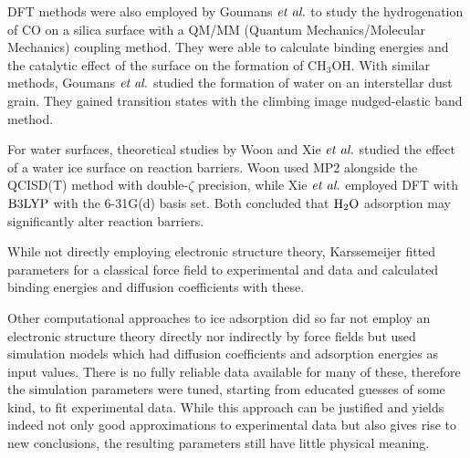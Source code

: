 DFT methods were also employed by Goumans $\emph{et al.}$ to study the hydrogenation of
CO on a silica surface with a QM/MM (Quantum Mechanics/Molecular
Mechanics) coupling method.
They were able to calculate binding energies and the catalytic effect of the
surface on the formation of CH$_3$OH.\cite{GoumansCatlowBrown2008} With similar
methods, Goumans $\emph{et al.}$  studied the formation of water on an
interstellar dust grain.\cite{GoumansCatlowBrownEtAl2009} They gained transition
states with the climbing image nudged-elastic band method\cite{HenkelmanUberuagaJonsson2000}.

For water surfaces, theoretical studies by Woon\cite{Woon2002}
and Xie $\emph{et al.}$\cite{XieDingSun2006} studied the effect of a water ice surface
on reaction barriers. Woon used MP2 \cite{MP2} alongside the QCISD(T)
\cite{QCISD} method with double-$\zeta$ precision, while Xie $\emph{et al.}$
employed DFT with $\text{B3LYP}$ with the 6-31G(d) basis set. Both concluded that
$\text H _2 \text O$ adsorption may significantly alter reaction barriers.

While not directly employing electronic structure theory, Karssemeijer fitted
parameters for a classical force field to experimental and  data
and calculated binding energies and diffusion coefficients with
these.\cite{KarssemeijerPedersenJonssonEtAl2012}

Other computational approaches to ice adsorption did so far not employ an
electronic structure theory directly nor indirectly by force fields but used
simulation models which had diffusion coefficients and adsorption energies as input values. There is no
fully reliable data available for many of these, therefore the simulation
parameters were tuned, starting from educated guesses of some kind, to fit
experimental data. While this approach can be justified and yields indeed not
only good approximations to experimental data but also gives rise to new conclusions,
the resulting parameters still have little physical meaning.

